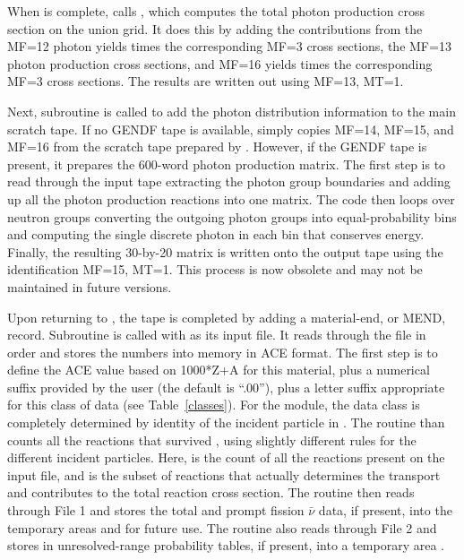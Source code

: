 When  is complete,  calls ,
 which computes the total photon production
cross section on the union grid. It does this by adding the
contributions from the MF=12 photon yields times the corresponding
MF=3 cross sections, the MF=13 photon production cross sections,
and MF=16 yields times the corresponding MF=3 cross sections.  The
results are written out using MF=13, MT=1.

Next, subroutine 
is called to add the photon distribution information
to the main scratch tape.  If no GENDF tape is available,
 simply copies MF=14, MF=15, and MF=16
from the scratch tape prepared by .  However, if the
GENDF tape is present, it prepares the 600-word photon production
matrix.  The first step is to read through the input tape extracting
the photon group boundaries and adding up all the photon production
reactions into one matrix.  The code then loops over neutron groups
converting the outgoing photon groups into equal-probability bins
and computing the single discrete photon in each bin that conserves
energy.  Finally, the resulting 30-by-20 matrix is written onto the
output tape using the identification MF=15, MT=1.  This process is
now obsolete and may not be maintained in future versions.

Upon returning to , the tape  is
completed by adding a material-end, or MEND, record.  Subroutine
 is called with
 as its input file.  It reads through the file
in order and stores the numbers into memory in ACE format.
 The first step is to define the ACE  value
based on 1000*Z+A for this material, plus a numerical
suffix provided by the user (the default is ``.00''),
plus a letter suffix appropriate for this class of data (see
Table~\ref{classes}).  For the  module, the data
class is completely determined by identity of the incident
particle in .  The routine than counts all the reactions
that survived , using slightly different rules for
the different incident particles.  Here,  is the
count of all the reactions present on the input  file,
and  is the subset of reactions that actually determines
the transport and contributes to the total reaction cross section.
The routine then reads through File 1 and stores the total and
prompt fission $\bar{\nu}$ data, if present, into the temporary
areas  and  for future use.  The routine
also reads through File 2 and stores in unresolved-range
probability tables, if present, into a temporary area .


